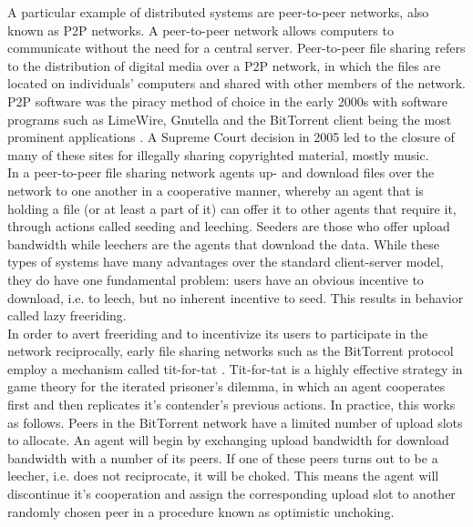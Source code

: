 \documentclass[sigconf]{acmart}
\theoremstyle{definition}
\begin{document}
\noindent A particular example of distributed systems are peer-to-peer networks, also known as P2P networks. A peer-to-peer network allows computers to communicate without the need for a central server. Peer-to-peer file sharing refers to the distribution of digital media over a P2P network, in which the files are located on individuals' computers and shared with other members of the network. P2P software was the piracy method of choice in the early 2000s with software programs such as LimeWire, Gnutella and the BitTorrent client being the most prominent applications \citep{The Early Days of Mass Internet Piracy Were Awesome Yet Awful}. A Supreme Court decision in 2005 led to the closure of many of these sites for illegally sharing copyrighted material, mostly music.\vspace{1em}\\

\noindent In a peer-to-peer file sharing network agents up- and download files over the network to one another in a cooperative manner, whereby an agent that is holding a file (or at least a part of it) can offer it to other agents that require it, through actions called seeding and leeching. Seeders are those who offer upload bandwidth while leechers are the agents that download the data. While these types of systems have many advantages over the standard client-server model, they do have one fundamental problem: users have an obvious incentive to download, i.e. to leech, but no inherent incentive to seed. This results in behavior called lazy freeriding. \vspace{1em}\\

\noindent In order to avert freeriding and to incentivize its users to participate in the network reciprocally, early file sharing networks such as the BitTorrent protocol employ a mechanism called tit-for-tat \citep{Peer-to-peer networking with BitTorrent}. Tit-for-tat is a highly effective strategy in game theory for the iterated prisoner's dilemma, in which an agent cooperates first and then replicates it's contender's previous actions. In practice, this works as follows. Peers in the BitTorrent network have a limited number of upload slots to allocate. An agent will begin by exchanging upload bandwidth for download bandwidth with a number of its peers. If one of these peers turns out to be a leecher, i.e. does not reciprocate, it will be choked. This means the agent will discontinue it's cooperation and assign the corresponding upload slot to another randomly chosen peer in a procedure known as optimistic unchoking. \vspace{1em}\\
\end{document}
